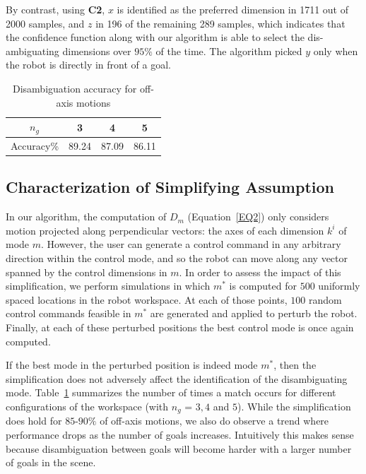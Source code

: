 \documentclass[conference]{IEEEtran}
\begin{document}
By contrast, using \textbf{C2}, $x$ is identified as the preferred
dimension in 1711 out of 2000 samples, and $z$ in 196 of the
remaining 289 samples, which indicates that the confidence
function along with our algorithm is able to select the dis-
ambiguating dimensions over $95\%$ of the time. The algorithm
picked $y$ only when the robot is directly in front of a goal.
\begin{table}[b]
	\centering
	\begin{tabular}{|c|c|c|c|}
		\hline
		$n_g$ & 3 & 4 & 5 \\
		\hline
		Accuracy\% & 89.24 & 87.09 & 86.11 \\
		\hline
	\end{tabular}
	\vspace{.2cm}
	\caption{Disambiguation accuracy for off-axis motions} 
	\label{SIM}
	\vspace{-.5cm}
\end{table}
\subsection{Characterization of Simplifying Assumption}
In our algorithm, the computation of $D_{m}$ (Equation~\ref{EQ2}) only considers motion projected along perpendicular vectors: the axes of each dimension $k^i$ of mode $m$. However, the user can generate a control command in any arbitrary direction within the control mode, and so the robot can move along any vector spanned by the control dimensions in $m$. In order to assess the impact of this simplification, we perform simulations in which $m^*$ is computed for $500$ uniformly spaced locations in the robot workspace. At each of those points, $100$ random control commands feasible in $m^*$ are generated and applied to perturb the robot. Finally, at each of these perturbed positions the best control mode is once again computed. 

If the best mode in the perturbed position is indeed mode $m^*$, then the simplification does not adversely affect the identification of the disambiguating mode. Table~\ref{SIM} summarizes the number of times a match occurs for different configurations of the workspace (with $n_g$ = $3,4$ and $5$). While the simplification does hold for $85$-$90\%$ of off-axis motions, we also do observe a trend where performance drops as the number of goals increases. Intuitively this makes sense because disambiguation between goals will become harder with a larger number of goals in the scene.
 
\end{document}
